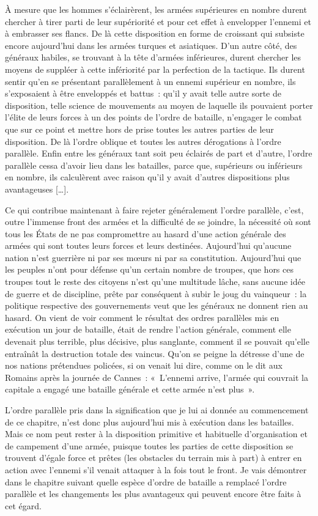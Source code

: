 \documentclass[french,twoside]{book} %
\begin{document}
À mesure que les hommes s’éclairèrent, les armées supérieures en nombre durent chercher à tirer parti de leur supériorité et pour cet effet à envelopper l’ennemi et à embrasser ses flancs. De là cette disposition en forme de croissant qui subsiste encore aujourd’hui dans les armées turques et asiatiques. D’un autre côté, des généraux habiles, se trouvant à la tête d’armées inférieures, durent chercher les moyens de suppléer à cette infériorité par la perfection de la tactique. Ils durent sentir qu’en se présentant parallèlement à un ennemi supérieur en nombre, ils s’exposaient à être enveloppés et battus : qu’il y avait telle autre sorte de disposition, telle science de mouvements au moyen de laquelle ils pouvaient porter l’élite de leurs forces à un des points de l’ordre de bataille, n’engager le combat que sur ce point et mettre hors de prise toutes les autres parties de leur disposition. De là l’ordre oblique et toutes les autres dérogations à l’ordre parallèle. Enfin entre les généraux tant soit peu éclairés de part et d’autre, l’ordre parallèle cessa d’avoir lieu dans les batailles, parce que, supérieurs ou inférieurs en nombre, ils calculèrent avec raison qu’il y avait d’autres dispositions plus avantageuses […].\par
Ce qui contribue maintenant à faire rejeter généralement l’ordre parallèle, c’est, outre l’immense front des armées et la difficulté de se joindre, la nécessité où sont tous les États de ne pas compromettre au hasard d’une action générale des armées qui sont toutes leurs forces et leurs destinées. Aujourd’hui qu’aucune nation n’est guerrière ni par ses mœurs ni par sa constitution. Aujourd’hui que les peuples n’ont pour défense qu’un certain nombre de troupes, que hors ces troupes tout le reste des citoyens n’est qu’une multitude lâche, sans aucune idée de guerre et de discipline, prête par conséquent à subir le joug du vainqueur : la politique respective des gouvernements veut que les généraux ne donnent rien au hasard. On vient de voir comment le résultat des ordres parallèles mis en exécution un jour de bataille, était de rendre l’action générale, comment elle devenait plus terrible, plus décisive, plus sanglante, comment il se pouvait qu’elle entraînât la destruction totale des vaincus. Qu’on se peigne la détresse d’une de nos nations prétendues policées, si on venait lui dire, comme on le dit aux Romains après la journée de Cannes : « L’ennemi arrive, l’armée qui couvrait la capitale a engagé une bataille générale et cette armée n’est plus ».\par
L’ordre parallèle pris dans la signification que je lui ai donnée au commencement de ce chapitre, n’est donc plus aujourd’hui mis à exécution dans les batailles. Mais ce nom peut rester à la disposition primitive et habituelle d’organisation et de campement d’une armée, puisque toutes les parties de cette disposition se trouvent d’égale force et prêtes (les obstacles du terrain mis à part) à entrer en action avec l’ennemi s’il venait attaquer à la fois tout le front. Je vais démontrer dans le chapitre suivant quelle espèce d’ordre de bataille a remplacé l’ordre parallèle et les changements les plus avantageux qui peuvent encore être faits à cet égard.\par
\end{document}
